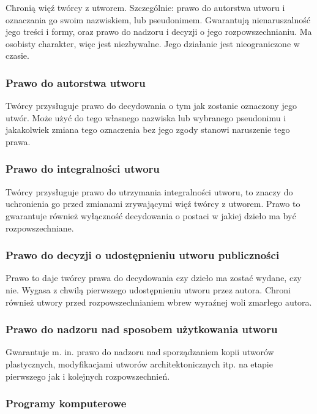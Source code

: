 \documentclass{article}
\begin{document}
Chronią więź twórcy z utworem.
Szczególnie: prawo do autorstwa utworu i oznaczania go swoim nazwiskiem, lub pseudonimem.
Gwarantują nienaruszalność jego treści i formy, oraz prawo do nadzoru i decyzji o jego rozpowszechnianiu.
Ma osobisty charakter, więc jest niezbywalne. Jego działanie jest nieograniczone w czasie.

\subsubsection{Prawo do autorstwa utworu}

Twórcy przysługuje prawo do decydowania o tym jak zostanie oznaczony jego utwór.
Może użyć do tego własnego nazwiska lub wybranego pseudonimu i jakakolwiek zmiana tego oznaczenia bez jego zgody stanowi naruszenie tego prawa.

\subsubsection{Prawo do integralności utworu}

Twórcy przysługuje prawo do utrzymania integralności utworu, to znaczy do uchronienia go przed zmianami zrywającymi więź twórcy z utworem.
Prawo to gwarantuje również wyłączność decydowania o postaci w jakiej dzieło ma być rozpowszechniane.

\subsubsection{Prawo do decyzji o udostępnieniu utworu publiczności}

Prawo to daje twórcy prawa do decydowania czy dzieło ma zostać wydane, czy nie. Wygasa z chwilą pierwszego udostępnieniu utworu przez autora. Chroni również utwory przed rozpowszechnianiem wbrew wyraźnej woli zmarłego autora.

\subsubsection{Prawo do nadzoru nad sposobem użytkowania utworu}

Gwarantuje m. in. prawo do nadzoru nad sporządzaniem kopii utworów plastycznych, modyfikacjami utworów architektonicznych itp. na etapie pierwszego jak i kolejnych rozpowszechnień.

\subsubsection{Programy komputerowe}
\end{document}
